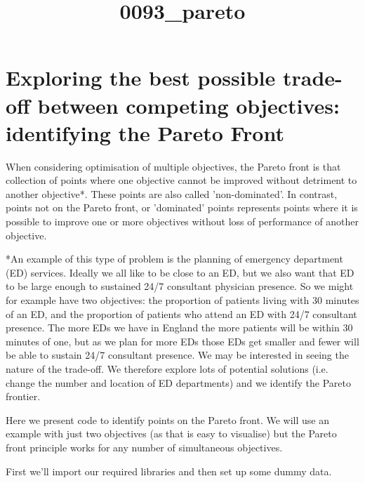 \documentclass[11pt]{article}
\title{0093\_pareto}
\begin{document}
    
    
    \maketitle
    
    

    
    \section{Exploring the best possible trade-off between competing
objectives: identifying the Pareto
Front}\label{exploring-the-best-possible-trade-off-between-competing-objectives-identifying-the-pareto-front}

When considering optimisation of multiple objectives, the Pareto front
is that collection of points where one objective cannot be improved
without detriment to another objective*. These points are also called
'non-dominated'. In contrast, points not on the Pareto front, or
'dominated' points represents points where it is possible to improve one
or more objectives without loss of performance of another objective.

*An example of this type of problem is the planning of emergency
department (ED) services. Ideally we all like to be close to an ED, but
we also want that ED to be large enough to sustained 24/7 consultant
physician presence. So we might for example have two objectives: the
proportion of patients living with 30 minutes of an ED, and the
proportion of patients who attend an ED with 24/7 consultant presence.
The more EDs we have in England the more patients will be within 30
minutes of one, but as we plan for more EDs those EDs get smaller and
fewer will be able to sustain 24/7 consultant presence. We may be
interested in seeing the nature of the trade-off. We therefore explore
lots of potential solutions (i.e. change the number and location of ED
departments) and we identify the Pareto frontier.

Here we present code to identify points on the Pareto front. We will use
an example with just two objectives (as that is easy to visualise) but
the Pareto front principle works for any number of simultaneous
objectives.

First we'll import our required libraries and then set up some dummy
data.
\end{document}
